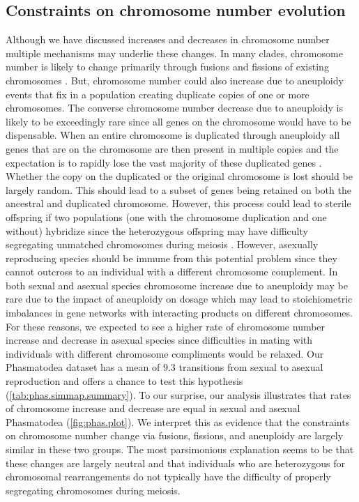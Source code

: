\subsection{Constraints on chromosome number evolution}
Although we have discussed increases and decreases in chromosome number multiple mechanisms may underlie these changes.
In many clades, chromosome number is likely to change primarily through fusions and fissions of existing chromosomes \citep{sved2016, blackmon2019meiotic}.
But, chromosome number could also increase due to aneuploidy events that fix in a population creating duplicate copies of one or more chromosomes.
The converse chromosome number decrease due to aneuploidy is likely to be exceedingly rare since all genes on the chromosome would have to be dispensable.
When an entire chromosome is duplicated through aneuploidy all genes that are on the chromosome are then present in multiple copies and the expectation is to rapidly lose the vast majority of these duplicated genes \citep{ohno}.
Whether the copy on the duplicated or the original chromosome is lost should be largely random.
This should lead to a subset of genes being retained on both the ancestral and duplicated chromosome.
However, this process could lead to sterile offspring if two populations (one with the chromosome duplication and one without) hybridize since the heterozygous offspring may have difficulty segregating unmatched chromosomes during meiosis \citep{white1978}.
However, asexually reproducing species should be immune from this potential problem since they cannot outcross to an individual with a different chromosome complement. 
In both sexual and asexual species chromosome increase due to aneuploidy may be rare due to the impact of aneuploidy on dosage which may lead to stoichiometric imbalances in gene networks with interacting products on different chromosomes.
For these reasons, we expected to see a higher rate of chromosome number increase and decrease in asexual species since difficulties in mating with individuals with different chromosome compliments would be relaxed.
Our Phasmatodea dataset has a mean of 9.3 transitions from sexual to asexual reproduction and offers a chance to test this hypothesis (\cref{tab:phas.simmap.summary}).
To our surprise, our analysis illustrates that rates of chromosome increase and decrease are equal in sexual and asexual Phasmatodea (\cref{fig:phas.plot}).
We interpret this as evidence that the constraints on chromosome number change via fusions, fissions, and aneuploidy are largely similar in these two groups. 
The most parsimonious explanation seems to be that these changes are largely neutral and that individuals who are heterozygous for chromosomal rearrangements do not typically have the difficulty of properly segregating chromosomes during meiosis.

